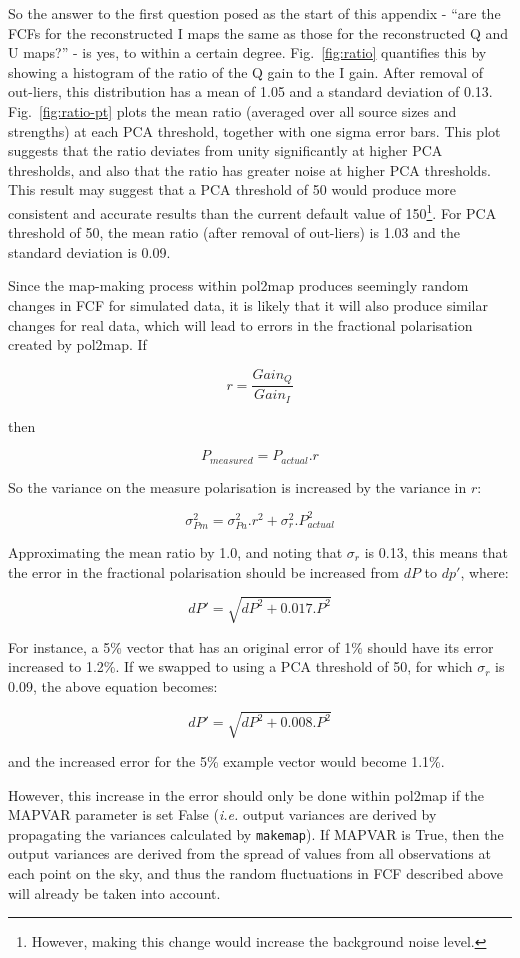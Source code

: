 \documentclass[twoside,11pt]{starlink}
\begin{document}
So the answer to the first question posed as the start of this appendix -
``are the FCFs for the reconstructed I maps the same as those for the
reconstructed Q and U maps?'' - is yes, to within a certain degree.
Fig.~\ref{fig:ratio} quantifies this by showing a histogram of the ratio
of the Q gain to the I gain. After removal of out-liers, this
distribution has a mean of 1.05 and a standard deviation of 0.13.
Fig.~\ref{fig:ratio-pt} plots the mean ratio (averaged over all source
sizes and strengths) at each PCA threshold, together with one sigma error
bars. This plot suggests that the ratio deviates from unity significantly
at higher PCA thresholds, and also that the ratio has greater noise at
higher PCA thresholds. This result may suggest that a PCA threshold of 50
would produce more consistent and accurate results than the current
default value of 150\footnote{However, making this change would increase
the background noise level.}. For PCA threshold of 50, the mean ratio
(after removal of out-liers) is 1.03 and the standard deviation is 0.09.

Since the map-making process within pol2map produces seemingly random
changes in FCF for simulated data, it is likely that it will also produce
similar changes for real data, which will lead to errors in the
fractional polarisation created by pol2map. If

\[ r = \frac{Gain_{Q}}{Gain_{I}} \]

then

\[ P_{measured} = P_{actual} . r \]

So the variance on the measure polarisation is increased by the variance
in $r$:

\[ \sigma^2_{Pm} = \sigma^2_{Pa}.r^2 + \sigma^2_r.P^2_{actual} \]

Approximating the mean ratio by 1.0, and noting that $\sigma_r$ is 0.13,
this means that the error in the fractional polarisation should be
increased from $dP$ to $dp'$, where:

\[ dP'  = \sqrt{ dP^2 + 0.017.P^2 } \]

For instance, a 5\% vector that has an original error of 1\% should have
its error increased to 1.2\%. If we swapped to using a PCA
threshold of 50, for which $\sigma_r$ is 0.09, the above equation becomes:

\[ dP'  = \sqrt{ dP^2 + 0.008.P^2 } \]

and the increased error for the 5\% example vector would become  1.1\%.

However, this increase in the error should only be done within
pol2map if the MAPVAR parameter is set False (\emph{i.e.} output
variances are derived by propagating the variances calculated by
\texttt{makemap}). If MAPVAR is True, then the output variances are derived from
the spread of values from all observations at each point on the sky, and
thus the random fluctuations in FCF described above will already be taken
into account.
\end{document}
